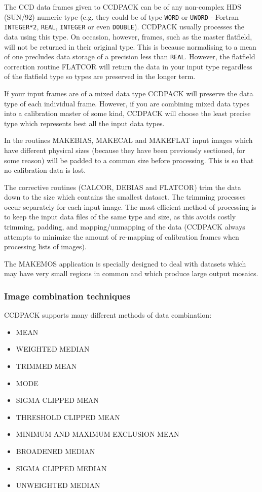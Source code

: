 \documentclass[twoside,11pt]{article}
\newcommand{\htmlref}[2]{#1}
\renewcommand{\_}{\texttt{\symbol{95}}}
\newcommand{\text}[1]{{\small \tt #1}}
\newcommand{\xroutine}[1]{\htmlref{{\sc #1}}{#1}}
\begin{document}
The CCD data frames given to CCDPACK can be of any non-complex HDS
(SUN/92) numeric type (e.g. they could be of type \text{\_WORD} or
\text{\_UWORD} - Fortran \text{INTEGER*2}, \text{\_REAL},
\text{\_INTEGER} or even  \text{\_DOUBLE}). CCDPACK usually processes
the data using this type. On occasion, however, frames, such as the
master flatfield, will not be returned in their original type. This is
because normalising to a mean of one precludes data storage of a
precision less than \text{\_REAL}. However, the flatfield correction routine
\xroutine{FLATCOR} will return the data in your input type regardless of the
flatfield type so types are preserved in the longer term.

If your input frames are of a mixed data type CCDPACK will preserve the data
type of each individual frame. However, if you are combining mixed data types
into a calibration master of some kind, CCDPACK will choose the least precise
type which represents best all the input data types.

In the routines \xroutine{MAKEBIAS}, \xroutine{MAKECAL} and
\xroutine{MAKEFLAT} input images which have
different physical sizes (because they have been previously sectioned,
for some reason) will be padded to a common size before processing. This
is so that no calibration data is lost.

The corrective routines (\xroutine{CALCOR}, \xroutine{DEBIAS} and \xroutine{FLATCOR}) trim the data down
to the size which contains the smallest dataset. The trimming processes
occur separately for each input image. The most efficient method of
processing is to keep the input data files of the same type and size, as
this avoids costly trimming, padding, and mapping/unmapping of the data
(CCDPACK always attempts to minimize the amount of re-mapping of
calibration frames when processing lists of images).

The \xroutine{MAKEMOS} application is specially designed to deal with datasets
which may have very small regions in common and which produce large
output mosaics.

\subsubsection{Image combination techniques \label{combinations}}

CCDPACK supports many different methods of data combination:
\begin{itemize}
\item MEAN
\item WEIGHTED MEDIAN
\item TRIMMED MEAN
\item MODE
\item SIGMA CLIPPED MEAN
\item THRESHOLD CLIPPED MEAN
\item MINIMUM AND MAXIMUM EXCLUSION MEAN
\item BROADENED MEDIAN
\item SIGMA CLIPPED MEDIAN
\item UNWEIGHTED MEDIAN
\end{itemize}
\end{document}
